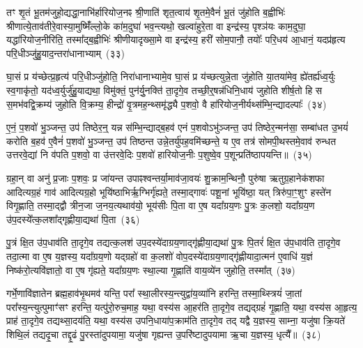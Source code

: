 तꣳ शृ॒तं भू॒तम॑जुहो॒द्यद्धा॒नाभि॑र्\mbox{}हारियोज॒नꣴ श्री॒णाति॑ शृत॒त्वाय॑ शृ॒तमे॒वैनं॑ भू॒तं जु॑होति ब॒ह्वीभिः॑ श्रीणात्ये॒ताव॑ती\-रे॒वास्या॒मुष्मिँ॑ल्लो॒के का॑म॒दुघा॑ भव॒न्त्यथो॒ खल्वा॑हुरे॒ता वा इन्द्र॑स्य॒ पृश्ञ॑यः काम॒दुघा॒ यद्धा॑रियोज॒नीरिति॒ तस्मा᳚द्\-ब॒ह्वीभिः॑ श्रीणीयादृख्सा॒मे वा इन्द्र॑स्य॒ हरी॑ सोम॒पानौ॒ तयोः᳚ परि॒धय॑ आ॒धानं॒ यदप्र॑हृत्य परि॒धीञ्जु॑हु॒याद॒न्तरा॑धानाभ्याम्~(३३)\ip

घा॒सं प्र य॑च्छेत्प्र॒हृत्य॑ परि॒धीञ्जु॑होति॒ निरा॑धानाभ्यामे॒व घा॒सं प्र य॑च्छत्युन्ने॒ता जु॑होति या॒तया॑मेव॒ ह्ये॑तर्\mbox{}ह्य॑ध्व॒र्युः स्व॒गाकृ॑तो॒ यद॑ध्व॒र्युर्जु॑हु॒याद्यथा॒ विमु॑क्तं॒ पुन॑र्यु॒नक्ति॑ ता॒दृगे॒व तच्छी॒र्॒\mbox{}षन्न॑धिनि॒धाय॑ जुहोति शीर्\mbox{}ष॒तो हि स स॒मभ॑वद्वि॒क्रम्य॑ जुहोति वि॒क्रम्य॒ हीन्द्रो॑ वृ॒त्रमह॒न्थ्समृ॑द्ध्यै प॒शवो॒ वै हा॑रियोज॒नीर्यथ्स॑म्भि॒न्द्यादल्पाः᳚~(३४)\ip

ए॒नं॒ प॒शवो॑ भु॒ञ्जन्त॒ उप॑ तिष्ठेर॒न्॒ यन्न स॑म्भि॒न्द्याद्ब॒हव॑ एनं प॒शवो\-ऽभु॑ञ्जन्त॒ उप॑ तिष्ठेर॒न्मन॑सा॒ सम्बा॑धत उ॒भयं॑ करोति ब॒हव॑ ए॒वैनं॑ प॒शवो॑ भु॒ञ्जन्त॒ उप॑ तिष्ठन्त उन्ने॒तर्यु॑पह॒वमि॑च्छन्ते॒ य ए॒व तत्र॑ सोमपी॒थस्तमे॒वाव॑ रुन्धत उत्तरवे॒द्यां नि व॑पति प॒शवो॒ वा उ॑त्तरवे॒दिः प॒शवो॑ हारियोज॒नीः प॒शुष्वे॒व प॒शून्प्रति॑\-ष्ठापयन्ति॥~(३५)\ip

{\anuvakamend[{अ॒श्री॒णा॒द॒न्तरा॑धानाभ्या॒मल्पाः᳚ स्थापयन्ति}]}

ग्रहा॒न् वा अनु॑ प्र॒जाः प॒शवः॒ प्र जा॑यन्त उपाꣴश्वन्तर्या॒माव॑जा॒वयः॑ शु॒क्राम॒न्थिनौ॒ पुरु॑षा ऋतुग्र॒हानेक॑शफा आदित्यग्र॒हं गाव॑ आदित्यग्र॒हो भूयि॑ष्ठाभिर्\mbox{}ऋ॒ग्भिर्गृ॑ह्यते॒ तस्मा॒द्गावः॑ पशू॒नां भूयि॑ष्ठा॒ यत् त्रिरु॑पा॒ꣳ॒शुꣳ हस्ते॑न विगृ॒ह्णाति॒ तस्मा॒द्द्वौ त्रीन॒जा ज॒नय॒त्यथाव॑यो॒ भूय॑सीः पि॒ता वा ए॒ष यदा᳚ग्रय॒णः पु॒त्रः क॒लशो॒ यदा᳚ग्रय॒ण उ॑प॒दस्ये᳚त्क॒लशा᳚द्गृह्णीया॒द्यथा॑ पि॒ता~(३६)\ip

पु॒त्रं क्षि॒त उ॑प॒धाव॑ति ता॒दृगे॒व तद्यत्क॒लश॑ उप॒दस्ये॑दाग्रय॒णाद्गृ॑ह्णीया॒द्यथा॑ पु॒त्रः पि॒तरं॑ क्षि॒त उ॑प॒धाव॑ति ता॒दृगे॒व तदा॒त्मा वा ए॒ष य॒ज्ञस्य॒ यदा᳚ग्रय॒णो यद्ग्रहो॑ वा क॒लशो॑ वोप॒दस्ये॑दाग्रय॒णाद्गृ॑ह्णीयादा॒त्मन॑ ए॒वाधि॑ य॒ज्ञं निष्क॑रो॒त्यवि॑ज्ञातो॒ वा ए॒ष गृ॑ह्यते॒ यदा᳚ग्रय॒णः स्था॒ल्या गृ॒ह्णाति॑ वाय॒व्ये॑न जुहोति॒ तस्मा᳚त्~(३७)\ip

गर्भे॒णावि॑ज्ञातेन ब्रह्म॒हाव॑भृ॒थमव॑ यन्ति॒ परा᳚ स्था॒लीरस्य॒न्त्युद्वा॑य॒व्या॑नि हरन्ति॒ तस्मा॒थ्स्त्रियं॑ जा॒तां परा᳚स्य॒न्त्यु\-त्पुमाꣳ॑सꣳ हरन्ति॒ यत्पु॑रो॒रुच॒माह॒ यथा॒ वस्य॑स आ॒हर॑ति ता॒दृगे॒व तद्यद्ग्रहं॑ गृ॒ह्णाति॒ यथा॒ वस्य॑स आ॒हृत्य॒ प्राह॑ ता॒दृगे॒व तद्यथ्सा॒दय॑ति॒ यथा॒ वस्य॑स उपनि॒धाया॑प॒क्राम॑ति ता॒दृगे॒व तद् यद्वै य॒ज्ञस्य॒ साम्ना॒ यजु॑षा क्रि॒यते॑ शिथि॒लं तद्यदृ॒चा तद्दृ॒ढं पु॒रस्ता॑दुपयामा॒ यजु॑षा गृह्यन्त उ॒परि॑ष्टादुपयामा ऋ॒चा य॒ज्ञस्य॒ धृत्यै᳚॥~(३८)\ip

